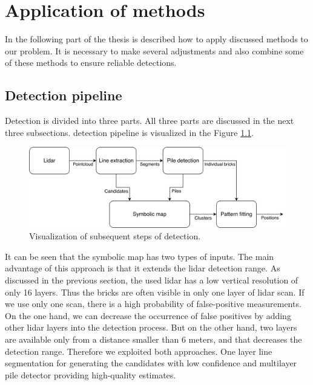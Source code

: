 \chapter{Application of methods}
In the following part of the thesis is described how to apply discussed methods to our problem. It is necessary to make several adjustments and also combine some of these methods to ensure reliable detections.

\section{Detection pipeline}
Detection is divided into three parts. All three parts are discussed in the next three subsections. detection pipeline is visualized in the Figure \ref{fig:flowchart}. 

\hspace{5px}
\begin{figure}[H]
\centering
\includegraphics[scale=0.06]{fig/flowchart.pdf}
\caption[Program pipeline]{Visualization of subsequent steps of detection.}
\label{fig:flowchart}
\end{figure}

It can be seen that the symbolic map has two types of inputs. The main advantage of this approach is that it extends the lidar detection range. As discussed in the previous section, the used lidar has a low vertical resolution of only 16 layers. Thus the bricks are often visible in only one layer of lidar scan. If we use only one scan, there is a high probability of false-positive measurements. On the one hand, we can decrease the occurrence of false positives by adding other lidar layers into the detection process. But on the other hand, two layers are available only from a distance smaller than 6 meters, and that decreases the detection range. Therefore we exploited both approaches. One layer line segmentation for generating the candidates with low confidence and multilayer pile detector providing high-quality estimates.


